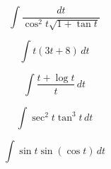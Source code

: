 \documentclass[12pt, letterpaper]{article}
\begin{document}
$$ \int \frac{dt}{\cos^2{t}\sqrt{1 + \tan{t}}} $$

\vspace*{0.7in}

$$ \int t \left( 3t + 8 \right) \, dt $$

\vspace*{0.7in}

$$ \int \frac{t + \log{t}}{t} \, dt $$

\vspace*{0.7in}

$$ \int \sec^2{t}\tan^3{t} \, dt $$

\vspace*{0.7in}

$$ \int \sin{t}\sin{(\cos{t})} \, dt $$
\end{document}
